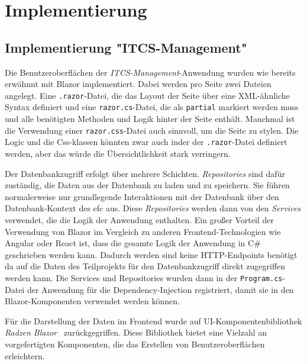 \chapter{Implementierung}\label{ch:Implementierung}
\section{Implementierung "ITCS-Management"}\label{sec:ImplementierungITCS-Management}
    Die Benutzeroberflächen der \emph{ITCS-Management}-Anwendung wurden wie bereits erwähnnt mit Blazor implementiert. Dabei werden pro Seite 
    zwei Dateien angelegt. Eine \texttt{.razor}-Datei, die das Layout der Seite über eine XML-ähnliche Syntax definiert
    und eine \texttt{razor.cs}-Datei, die als \texttt{partial} markiert werden muss und alle benötigten Methoden und Logik hinter der Seite enthält. Manchmal ist die Verwendung einer \texttt{razor.css}-Datei 
    auch sinnvoll, um die Seite zu stylen. Die Logic und die Css-klassen könnten zwar auch inder der \texttt{.razor}-Datei definiert werden,
    aber das würde die Übersichtlichkeit stark verringern. 
    
    Der Datenbankzugriff erfolgt über mehrere Schichten. \emph{Repositories} sind dafür zuständig, 
    die Daten aus der Datenbank zu laden und zu speichern. Sie führen normalerweise nur grundlegende Interaktionen mit der Datenbank über den Datenbank-Kontext des \gls{efc} aus.
    Diese \emph{Repositories} werden dann von den \emph{Services} verwendet, die die Logik der Anwendung enthalten. Ein großer 
    Vorteil der Verwendung von Blazor im Vergleich zu anderen Frontend-Technologien wie Angular oder React ist, dass die gesamte Logik der Anwendung in
    C\# geschrieben werden kann. Dadurch werden sind keine HTTP-Endpoints benötigt da auf die Daten des Teilprojekts für den Datenbankzugriff direkt zugegriffen werden kann.
    Die Services und Repositories wurden dann in der \texttt{Program.cs}-Datei der Anwendung für die Dependency-Injection registriert,
    damit sie in den Blazor-Komponenten verwendet werden können.

    Für die Darstellung der Daten im Frontend wurde auf UI-Komponentenbibliothek \emph{Radzen Blazor}~\cite{radzen} zurückgegriffen. 
    Diese Bibliothek bietet eine Vielzahl an vorgefertigten Komponenten, die das Erstellen von Benutzeroberflächen erleichtern.
    
